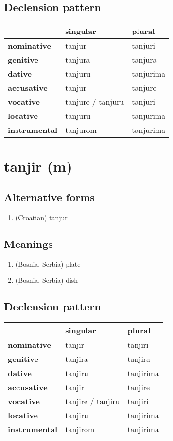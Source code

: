 \subsection*{Declension pattern}
\begin{tabularx}{\linewidth}{Xll}
\toprule
{} &           singular &     plural \\
\midrule
\textbf{nominative  } &             tanjur &    tanjuri \\
\textbf{genitive    } &            tanjura &    tanjura \\
\textbf{dative      } &            tanjuru &  tanjurima \\
\textbf{accusative  } &             tanjur &    tanjure \\
\textbf{vocative    } &  tanjure / tanjuru &    tanjuri \\
\textbf{locative    } &            tanjuru &  tanjurima \\
\textbf{instrumental} &           tanjurom &  tanjurima \\
\bottomrule
\end{tabularx}

\filbreak
\section{tanjir (m)}
\subsection*{Alternative forms}
\begin{enumerate}
\item (Croatian) tanjur
\end{enumerate}
\subsection*{Meanings}
\begin{enumerate}
\item (Bosnia, Serbia) plate
\item (Bosnia, Serbia) dish
\end{enumerate}
\subsection*{Declension pattern}
\begin{tabularx}{\linewidth}{Xll}
\toprule
{} &           singular &     plural \\
\midrule
\textbf{nominative  } &             tanjir &    tanjiri \\
\textbf{genitive    } &            tanjira &    tanjira \\
\textbf{dative      } &            tanjiru &  tanjirima \\
\textbf{accusative  } &             tanjir &    tanjire \\
\textbf{vocative    } &  tanjire / tanjiru &    tanjiri \\
\textbf{locative    } &            tanjiru &  tanjirima \\
\textbf{instrumental} &           tanjirom &  tanjirima \\
\bottomrule
\end{tabularx}

